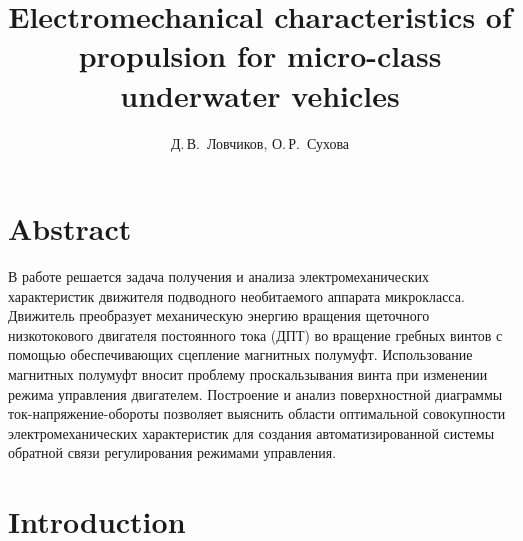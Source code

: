 \documentclass[12pt, twoside]{article}
\title{Electromechanical characteristics of propulsion for micro-class underwater vehicles}
\author{Д.\,В.~Ловчиков, О.\,Р.~Сухова}
\date{}
\begin{document}
\maketitle
\linenumbers
\section{Abstract}
В работе решается задача получения и анализа электромеханических характеристик движителя подводного необитаемого аппарата микрокласса. Движитель преобразует механическую энергию вращения щеточного низкотокового двигателя постоянного тока (ДПТ) во вращение гребных винтов с помощью обеспечивающих сцепление магнитных полумуфт. Использование магнитных полумуфт вносит проблему проскальзывания винта при изменении режима управления двигателем. Построение и анализ поверхностной диаграммы ток-напряжение-обороты позволяет выяснить области оптимальной совокупности электромеханических характеристик для создания автоматизированной системы обратной связи регулирования режимами управления.
\section{Introduction}
\end{document}
